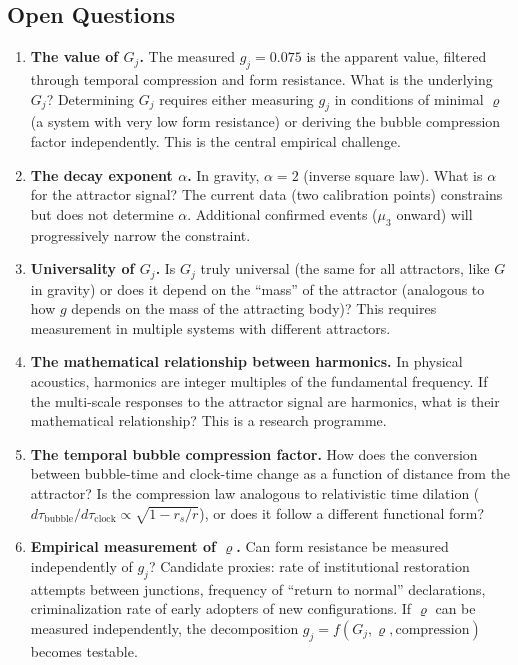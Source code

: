 \documentclass[12pt,a4paper]{article}
\newcommand{\gj}{g_j}
\newcommand{\Gj}{G_j}
\newcommand{\rhof}{\varrho}
\begin{document}
\subsection{Open Questions}

\begin{enumerate}[label=\textbf{Q\arabic*.}]
    \item \textbf{The value of $\Gj$.} The measured $\gj = 0.075$ is the apparent value, filtered through temporal compression and form resistance. What is the underlying $\Gj$? Determining $\Gj$ requires either measuring $\gj$ in conditions of minimal $\rhof$ (a system with very low form resistance) or deriving the bubble compression factor independently. This is the central empirical challenge.
    \item \textbf{The decay exponent $\alpha$.} In gravity, $\alpha = 2$ (inverse square law). What is $\alpha$ for the attractor signal? The current data (two calibration points) constrains but does not determine $\alpha$. Additional confirmed events ($\mu_3$ onward) will progressively narrow the constraint.
    \item \textbf{Universality of $\Gj$.} Is $\Gj$ truly universal (the same for all attractors, like $G$ in gravity) or does it depend on the ``mass'' of the attractor (analogous to how $g$ depends on the mass of the attracting body)? This requires measurement in multiple systems with different attractors.
    \item \textbf{The mathematical relationship between harmonics.} In physical acoustics, harmonics are integer multiples of the fundamental frequency. If the multi-scale responses to the attractor signal are harmonics, what is their mathematical relationship? This is a research programme.
    \item \textbf{The temporal bubble compression factor.} How does the conversion between bubble-time and clock-time change as a function of distance from the attractor? Is the compression law analogous to relativistic time dilation ($d\tau_{\mathrm{bubble}}/d\tau_{\mathrm{clock}} \propto \sqrt{1 - r_s/r}$), or does it follow a different functional form?
    \item \textbf{Empirical measurement of $\rhof$.} Can form resistance be measured independently of $\gj$? Candidate proxies: rate of institutional restoration attempts between junctions, frequency of ``return to normal'' declarations, criminalization rate of early adopters of new configurations. If $\rhof$ can be measured independently, the decomposition $\gj = f(\Gj, \rhof, \text{compression})$ becomes testable.
\end{enumerate}
\end{document}
